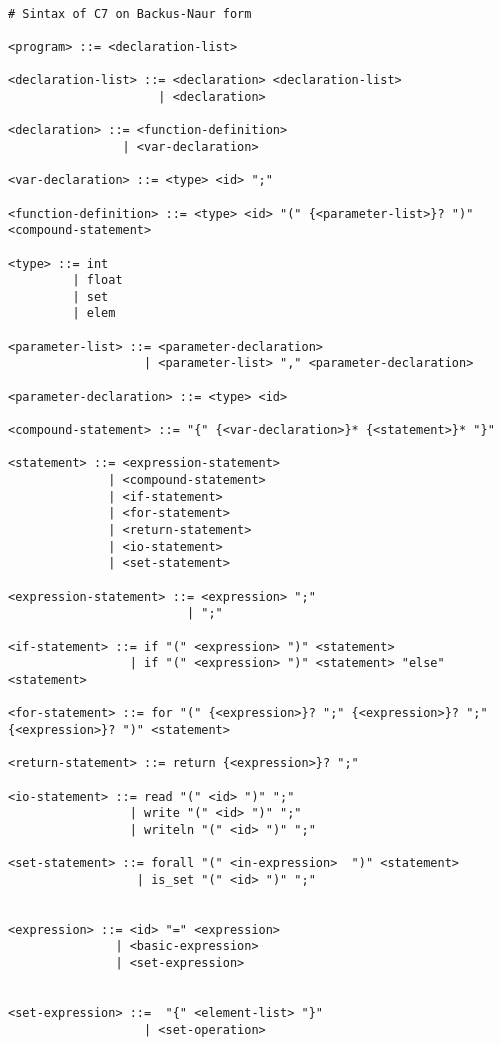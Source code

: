 \documentclass[runningheads]{llncs}
\begin{document}
\begin{sizepar}{8}{10}
\begin{verbatim}

# Sintax of C7 on Backus-Naur form

<program> ::= <declaration-list>

<declaration-list> ::= <declaration> <declaration-list> 
                     | <declaration>

<declaration> ::= <function-definition>
                | <var-declaration>

<var-declaration> ::= <type> <id> ";"

<function-definition> ::= <type> <id> "(" {<parameter-list>}? ")" <compound-statement>

<type> ::= int
         | float
         | set 
         | elem

<parameter-list> ::= <parameter-declaration>
                   | <parameter-list> "," <parameter-declaration>

<parameter-declaration> ::= <type> <id>

<compound-statement> ::= "{" {<var-declaration>}* {<statement>}* "}"

<statement> ::= <expression-statement>
              | <compound-statement>
              | <if-statement>
              | <for-statement>
              | <return-statement>
              | <io-statement>
              | <set-statement>

<expression-statement> ::= <expression> ";" 
                         | ";"

<if-statement> ::= if "(" <expression> ")" <statement>
                 | if "(" <expression> ")" <statement> "else" <statement>

<for-statement> ::= for "(" {<expression>}? ";" {<expression>}? ";" {<expression>}? ")" <statement>

<return-statement> ::= return {<expression>}? ";"

<io-statement> ::= read "(" <id> ")" ";"
                 | write "(" <id> ")" ";"
                 | writeln "(" <id> ")" ";"

<set-statement> ::= forall "(" <in-expression>  ")" <statement>
                  | is_set "(" <id> ")" ";"


<expression> ::= <id> "=" <expression> 
               | <basic-expression>
               | <set-expression>


<set-expression> ::=  "{" <element-list> "}" 
                   | <set-operation>


\end{verbatim}
\end{sizepar}
\end{document}
